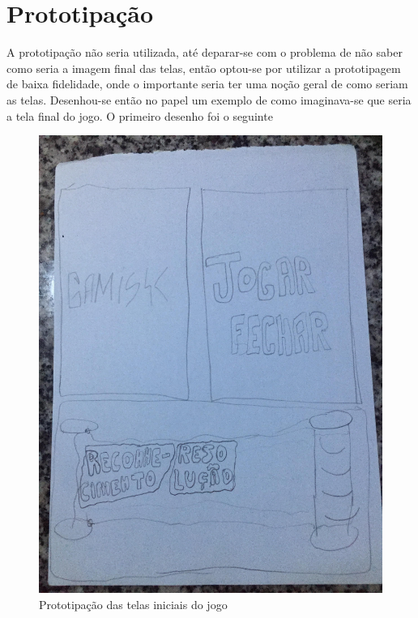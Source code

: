 \section[Prototipação]{Prototipação}

A prototipação não seria utilizada, até deparar-se com o problema de não saber como seria a imagem final das telas, então optou-se por utilizar a prototipagem de baixa fidelidade, onde o importante seria ter uma noção geral de como seriam as telas. Desenhou-se então no papel um exemplo de como imaginava-se que seria a tela final do jogo. O primeiro desenho foi o seguinte

\begin{figure}[H]
\centering
\caption{Prototipação das telas iniciais do jogo}
\label{prot0}
\includegraphics[scale=0.0814]{figuras/prot0.jpg}
\end{figure}

